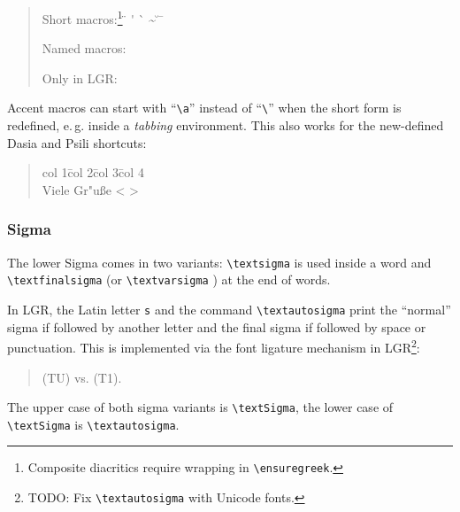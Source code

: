 \documentclass[a4paper, parskip=true]{scrartcl}
\newcommand*{\greekfontencoding}{TU}
\newcommand*{\greekfontencoding}{LGR}
\newcommand*{\latinencoding}{T1}
\newcommand{\cs}[1]{\texttt{\textbackslash#1}}
\begin{document}
\begin{quote}
  Short macros:\footnote{
    Composite diacritics require wrapping in \cs{ensuregreek}.}
  \"{} \'{} \`{} \~{} \<{} \>{} \u{} \={}

  Named macros:
  \accdialytika{}
  \acctonos{}
  \accvaria{}
  \accperispomeni{}
  \accdasia{}
  \accpsili{}
  \ypogegrammeni{}
  \prosgegrammeni{}
  \accdialytikaperispomeni{}
  \accdialytikatonos{}
  \accdialytikavaria{}
  \accdasiaperispomeni{}
  \accdasiavaria{}
  \accdasiaoxia{}
  \accpsiliperispomeni{}
  \accpsilioxia{}
  \accpsilivaria{}
  \ifdefined\UnicodeEncodingName
  \else

    Only in LGR:
    \accinvertedbrevebelow{} %
    \accbrevebelow{}
  \fi
\end{quote}

\medskip\noindent
Accent macros can start with ``\verb|\a|'' instead of ``\verb|\|'' when the
short form is redefined, e.\,g. inside a \emph{tabbing} environment.
This also works for the new-defined Dasia and Psili shortcuts:
\begin{quote}
  \begin{tabbing}
       col 1\quad \= col 2\quad \= col 3\quad \= col 4\quad \\
       Viele      \> Gr\a"u\ss e
       \> \greekscript \a<\textalpha{}
       \> \greekscript \a>\textomega
  \end{tabbing}
\end{quote}

\subsubsection{Sigma}

The lower Sigma comes in two variants: \verb|\textsigma| \textsigma{} is
used inside a word and \verb|\textfinalsigma| \textfinalsigma{} (or
\verb|\textvarsigma| \textvarsigma{}) at the end of words.

In LGR, the Latin letter \verb|s| and the command \verb|\textautosigma|
print the ``normal'' sigma if followed by another letter and the final sigma
if followed by space or punctuation. This is implemented via the font
ligature mechanism in LGR\footnote{
  TODO: Fix \cs{textautosigma} with Unicode fonts.}:
\begin{quote}
  \ensuregreek{\textautosigma\textautosigma} (\greekfontencoding) vs.
  \textautosigma{}\textautosigma{} (\latinencoding).
\end{quote}
The upper case of both sigma variants is \verb|\textSigma|, the lower case
of \cs{textSigma} is \cs{textautosigma}.
\end{document}
